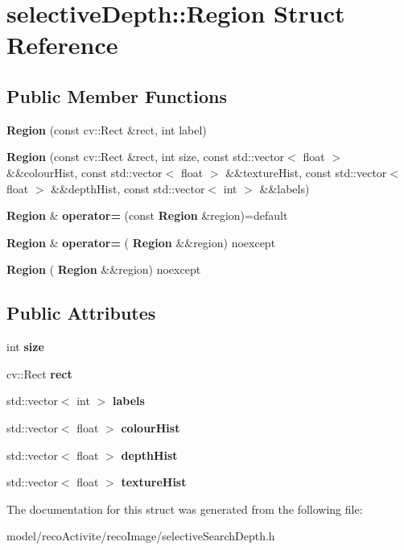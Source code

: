 \section{selective\+Depth\+:\+:Region Struct Reference}
\label{structselective_depth_1_1_region}
\subsection*{Public Member Functions}
\begin{DoxyCompactItemize}
\item 
\mbox{\label{structselective_depth_1_1_region_a5d659fccd0750c226b4fc63821ced175}} 
{\bfseries Region} (const cv\+::\+Rect \&rect, int label)
\item 
\mbox{\label{structselective_depth_1_1_region_aac63503bd4bb216501ea003277d83147}} 
{\bfseries Region} (const cv\+::\+Rect \&rect, int size, const std\+::vector$<$ float $>$ \&\&colour\+Hist, const std\+::vector$<$ float $>$ \&\&texture\+Hist, const std\+::vector$<$ float $>$ \&\&depth\+Hist, const std\+::vector$<$ int $>$ \&\&labels)
\item 
\mbox{\label{structselective_depth_1_1_region_aa8b1558d6089c3f1a4b57fef0f7b388e}} 
\textbf{ Region} \& {\bfseries operator=} (const \textbf{ Region} \&region)=default
\item 
\mbox{\label{structselective_depth_1_1_region_a77d71d191f85c9d85406531fd77278b8}} 
\textbf{ Region} \& {\bfseries operator=} (\textbf{ Region} \&\&region) noexcept
\item 
\mbox{\label{structselective_depth_1_1_region_ad51caeb8db9aaa3f1b4bc29190fbd4be}} 
{\bfseries Region} (\textbf{ Region} \&\&region) noexcept
\end{DoxyCompactItemize}
\subsection*{Public Attributes}
\begin{DoxyCompactItemize}
\item 
\mbox{\label{structselective_depth_1_1_region_a11936f5e3d03b380f1595f49420e39ed}} 
int {\bfseries size}
\item 
\mbox{\label{structselective_depth_1_1_region_acd1a7d83bb4732aa745f86717bdeb680}} 
cv\+::\+Rect {\bfseries rect}
\item 
\mbox{\label{structselective_depth_1_1_region_a1f2e7d85d30ddfb0a8705796ff2afaea}} 
std\+::vector$<$ int $>$ {\bfseries labels}
\item 
\mbox{\label{structselective_depth_1_1_region_a56fe4fb764ef369ef10559807663a4d8}} 
std\+::vector$<$ float $>$ {\bfseries colour\+Hist}
\item 
\mbox{\label{structselective_depth_1_1_region_a423f4dd693b66de386f4a7470c567557}} 
std\+::vector$<$ float $>$ {\bfseries depth\+Hist}
\item 
\mbox{\label{structselective_depth_1_1_region_a60db1050fdd57c5803c50405fdb3ea1d}} 
std\+::vector$<$ float $>$ {\bfseries texture\+Hist}
\end{DoxyCompactItemize}


The documentation for this struct was generated from the following file\+:\begin{DoxyCompactItemize}
\item 
model/reco\+Activite/reco\+Image/selective\+Search\+Depth.\+h\end{DoxyCompactItemize}
